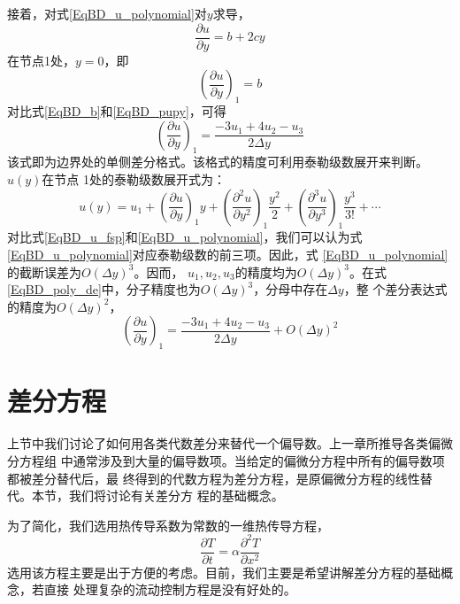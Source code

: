 接着，对式\eqref{EqBD_u_polynomial}对$y$求导，
\begin{equation}
\frac{\partial u}{\partial y}
=
b + 2cy
\end{equation}
在节点1处，$y=0$，即
\begin{equation}
  \left(
\frac{\partial u}{\partial y}
  \right)_{1}
  =
  b
  \label{EqBD_pupy}
\end{equation}
对比式\eqref{EqBD_b}和\eqref{EqBD_pupy}，可得
\begin{equation}
  \left(
\frac{\partial u}{\partial y}
  \right)_{1}
  =
  \frac{-3u_{1}+4u_{2}-u_{3}}{2\Delta y}
  \label{EqBD_poly_de}
\end{equation}
该式即为边界处的单侧差分格式。该格式的精度可利用泰勒级数展开来判断。$u(y)$在节点
1处的泰勒级数展开式为：
\begin{equation}
  u(y) = 
  u_{1}
  +
  \left(
  \frac{\partial u}{\partial y}
  \right)_{1}y
  +
  \left(
    \frac{\partial^{2} u}{\partial y^{2}}
  \right)_{1}
  \frac{y^{2}}{2}
  +
  \left(
    \frac{\partial^{3} u}{\partial y^{3}}
  \right)_{1}
  \frac{y^{3}}{3!}
  +
  \cdots
  \label{EqBD_u_fsp}
\end{equation}
对比式\eqref{EqBD_u_fsp}和\eqref{EqBD_u_polynomial}，我们可以认为式
\eqref{EqBD_u_polynomial}对应泰勒级数的前三项。因此，式
\eqref{EqBD_u_polynomial}的截断误差为$O(\Delta y)^{3}$。因而，
$u_{1},u_{2},u_{3}$的精度均为$O(\Delta y)^{3}$。在式
\eqref{EqBD_poly_de}中，分子精度也为$O(\Delta y)^{3}$，分母中存在$\Delta y$，整
个差分表达式的精度为$O(\Delta y)^{2}$，
\begin{equation}
  \left(
\frac{\partial u}{\partial y}
  \right)_{1}
  =
  \frac{-3u_{1}+4u_{2}-u_{3}}{2\Delta y}
  +
  O(\Delta y)^{2}
\end{equation}

\section{差分方程}
上节中我们讨论了如何用各类代数差分来替代一个偏导数。上一章所推导各类偏微分方程组
中通常涉及到大量的偏导数项。当给定的偏微分方程中所有的偏导数项都被差分替代后，最
终得到的代数方程为差分方程，是原偏微分方程的线性替代。本节，我们将讨论有关差分方
程的基础概念。

为了简化，我们选用热传导系数为常数的一维热传导方程，
\begin{equation}
\frac{\partial T}{\partial t}
=
\alpha
\frac{\partial^{2} T}{\partial x^{2}}
\label{EqBD_1dht}
\end{equation}
选用该方程主要是出于方便的考虑。目前，我们主要是希望讲解差分方程的基础概念，若直接
处理复杂的流动控制方程是没有好处的。

